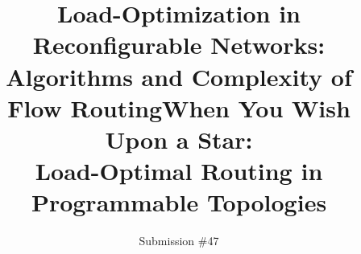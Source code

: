\documentclass[sigconf]{acmart}
\newcommand\klaus[1]{\color{olive}\textbf{Klaus: #1}\color{black}}
\begin{document}
\title[Load-Optimization in Reconfigurable Networks: Algorithms and Complexity of Flow Routing]{Load-Optimization in Reconfigurable Networks:\\ Algorithms and Complexity of Flow Routing}

\title[When You Wish Upon a Star: Load-Optimal Routing in Programmable Topologies]{When You Wish Upon a Star:\\ Load-Optimal Routing in  Programmable Topologies} 


\author{Submission \#47}

\end{document}
